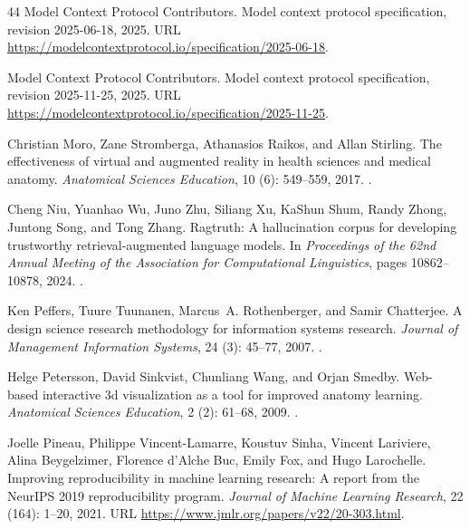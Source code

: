 \begin{thebibliography}{44}
{Model Context Protocol Contributors}.
\newblock Model context protocol specification, revision 2025-06-18,
  2025{}.
\newblock URL \url{https://modelcontextprotocol.io/specification/2025-06-18}.

{Model Context Protocol Contributors}.
\newblock Model context protocol specification, revision 2025-11-25,
  2025{}.
\newblock URL \url{https://modelcontextprotocol.io/specification/2025-11-25}.

Christian Moro, Zane Stromberga, Athanasios Raikos, and Allan Stirling.
\newblock The effectiveness of virtual and augmented reality in health sciences
  and medical anatomy.
\newblock \emph{Anatomical Sciences Education}, 10 (6):
  549--559, 2017.
\newblock {}.

Cheng Niu, Yuanhao Wu, Juno Zhu, Siliang Xu, KaShun Shum, Randy Zhong, Juntong
  Song, and Tong Zhang.
\newblock Ragtruth: A hallucination corpus for developing trustworthy
  retrieval-augmented language models.
\newblock In \emph{Proceedings of the 62nd Annual Meeting of the Association
  for Computational Linguistics}, pages 10862--10878, 2024.
\newblock {}.

Ken Peffers, Tuure Tuunanen, Marcus~A. Rothenberger, and Samir Chatterjee.
\newblock A design science research methodology for information systems
  research.
\newblock \emph{Journal of Management Information Systems}, 24
  (3): 45--77, 2007.
\newblock {}.

Helge Petersson, David Sinkvist, Chunliang Wang, and Orjan Smedby.
\newblock Web-based interactive 3d visualization as a tool for improved anatomy
  learning.
\newblock \emph{Anatomical Sciences Education}, 2 (2):
  61--68, 2009.
\newblock {}.

Joelle Pineau, Philippe Vincent-Lamarre, Koustuv Sinha, Vincent Lariviere,
  Alina Beygelzimer, Florence d'Alche Buc, Emily Fox, and Hugo Larochelle.
\newblock Improving reproducibility in machine learning research: A report from
  the {NeurIPS} 2019 reproducibility program.
\newblock \emph{Journal of Machine Learning Research}, 22
  (164): 1--20, 2021.
\newblock URL \url{https://www.jmlr.org/papers/v22/20-303.html}.


\end{thebibliography}
